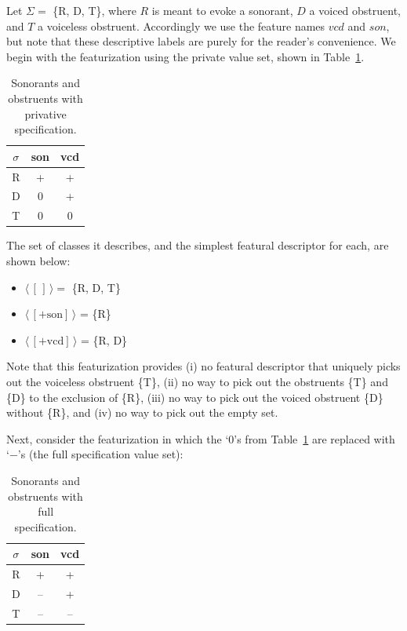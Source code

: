 \documentclass[11pt, oneside]{article}   	%
\begin{document}
Let $\Sigma =$ \{R, D, T\}, where $R$ is meant to evoke a sonorant, $D$ a voiced obstruent, and $T$ a voiceless obstruent. Accordingly we use the feature names $vcd$ and $son$, but note that these descriptive labels are purely for the reader's convenience. We begin with the featurization using the private value set, shown in Table~\ref{table:privative}.

\begin{table}[h]
    \centering
    \begin{tabular} {|c||c|c|}
    \hline
        $\sigma$ & son & vcd \\ \hline
        R & + & + \\
        D & 0 & + \\
        T & 0 & 0 \\
        \hline
    \end{tabular}
    \caption{Sonorants and obstruents with privative specification.}
    \label{table:privative}
\end{table}

\noindent The set of classes it describes, and the simplest featural descriptor for each, are shown below: \begin{itemize}
  \item $\langle \, [\,] \, \rangle = $ \{R, D, T\}
  \item $\langle \, [+\text{son}] \, \rangle$ = \{R\}
  \item $\langle \, [+\text{vcd}] \, \rangle$ = \{R, D\}
  \end{itemize}
  
\noindent Note that this featurization provides (i) no featural descriptor that uniquely picks out the voiceless obstruent \{T\}, (ii) no way to pick out the obstruents \{T\} and \{D\} to the exclusion of \{R\}, (iii) no way to pick out the voiced obstruent \{D\} without \{R\}, and (iv) no way to pick out the empty set.

Next, consider the featurization in which the `$0$'s from Table~\ref{table:privative} are replaced with `$-$'s (the full specification value set):

\begin{table}[h]
    \centering
    \begin{tabular} {|c||c|c|}
    \hline
        $\sigma$ & son & vcd \\ \hline
        R & + & + \\
        D & -- & + \\
        T & -- & -- \\
        \hline
    \end{tabular}
    \caption{Sonorants and obstruents with full specification.}
    \label{table:full}
\end{table}
\end{document}

